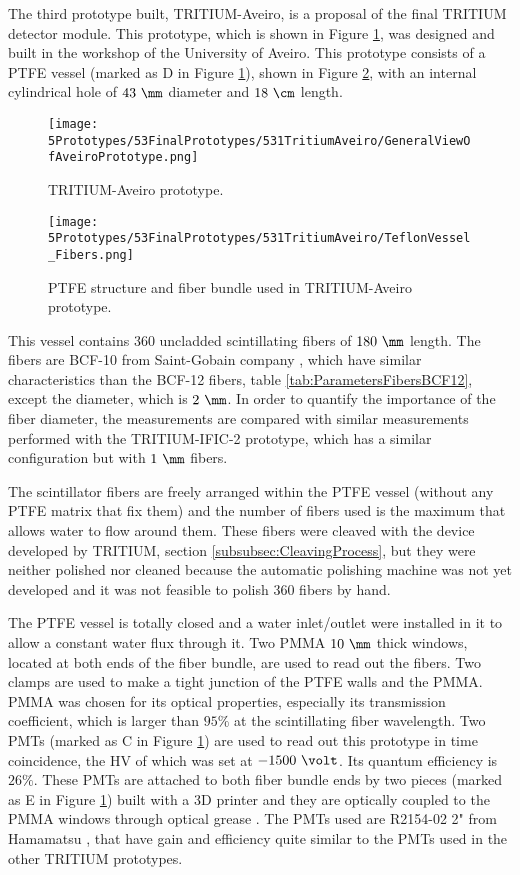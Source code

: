 The third prototype built, TRITIUM-Aveiro, is a proposal of the final TRITIUM detector module. This prototype, which is shown in Figure \ref{fig:TritiumAveiro0}, was designed and built in the workshop of the University of Aveiro. This prototype consists of a PTFE vessel (marked as D in Figure \ref{fig:TritiumAveiro0}), shown in Figure \ref{fig:TeflonStructureFibersTritiumAveiro0}, with an internal cylindrical hole of $43~\mm$ diameter and $18~\cm$ length.

\begin{figure}[h]
\centering
\texttt{[image: 5Prototypes/53FinalPrototypes/531TritiumAveiro/GeneralViewOfAveiroPrototype.png]}
\caption{TRITIUM-Aveiro prototype.\label{fig:TritiumAveiro0}}
\end{figure}
 
\begin{figure}[h]
\centering
\texttt{[image: 5Prototypes/53FinalPrototypes/531TritiumAveiro/TeflonVessel\_Fibers.png]}
\caption{PTFE structure and fiber bundle used in TRITIUM-Aveiro prototype.\label{fig:TeflonStructureFibersTritiumAveiro0}}
\end{figure}
This vessel contains $360$ uncladded scintillating fibers of $180~\mm$ length. The fibers are BCF-10 from Saint-Gobain company \cite{DataSheetBCF12Fiber}, which have similar characteristics than the BCF-12 fibers, table \ref{tab:ParametersFibersBCF12}, except the diameter, which is $2~\mm$. In order to quantify the importance of the fiber diameter, the measurements are compared with similar measurements performed with the TRITIUM-IFIC-2 prototype, which has a similar configuration but with $1~\mm$ fibers.

The scintillator fibers are freely arranged within the PTFE vessel (without any PTFE matrix that fix them) and the number of fibers used is the maximum that allows water to flow around them. These fibers were cleaved with the device developed by TRITIUM, section \ref{subsubsec:CleavingProcess}, but they were neither polished nor cleaned because the automatic polishing machine was not yet developed and it was not feasible to polish 360 fibers by hand. 

The PTFE vessel is totally closed and  a water inlet/outlet were installed in it to allow a constant water flux through it. Two PMMA $10~\mm$ thick windows, located at both ends of the fiber bundle, are used to read out the fibers. Two clamps are used to make a tight junction of the PTFE walls and the PMMA. PMMA was chosen for its optical properties, especially its transmission coefficient, which is larger than $95\%$ at the scintillating fiber wavelength. Two PMTs (marked as C in Figure \ref{fig:TritiumAveiro0}) are used to read out this prototype in time coincidence, the HV of which was set at $-1500~\volt$. Its quantum efficiency is $26\%$. These PMTs are attached to both fiber bundle ends by two pieces (marked as E in Figure \ref{fig:TritiumAveiro0}) built with a 3D printer and they are optically coupled to the PMMA windows through optical grease \cite{OpticalGrease}. The PMTs used are R2154-02 2" from Hamamatsu \cite{DataSheetPMTsAveiro}, that have gain and efficiency quite similar to the PMTs used in the other TRITIUM prototypes.

